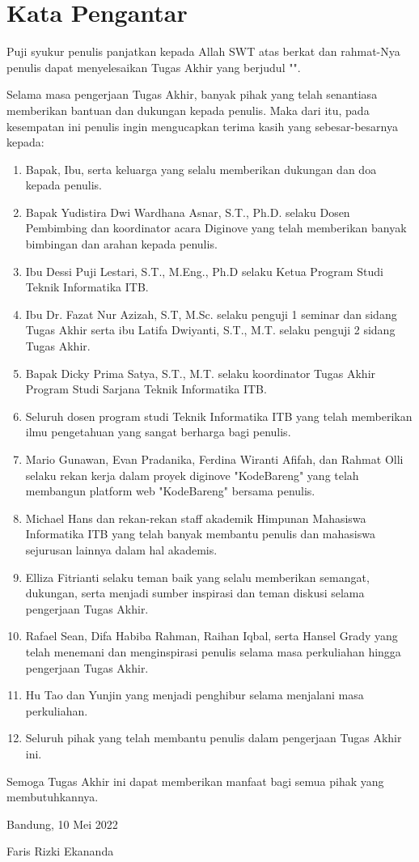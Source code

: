 \chapter*{Kata Pengantar}

Puji syukur penulis panjatkan kepada Allah SWT atas berkat dan rahmat-Nya penulis dapat menyelesaikan Tugas Akhir yang berjudul "\thetitle".

Selama masa pengerjaan Tugas Akhir, banyak pihak yang telah senantiasa memberikan bantuan dan dukungan kepada penulis. Maka dari itu, pada kesempatan ini penulis ingin mengucapkan terima kasih yang sebesar-besarnya kepada:

\begin{enumerate}
  \item Bapak, Ibu, serta keluarga yang selalu memberikan dukungan dan doa kepada penulis.
  \item Bapak Yudistira Dwi Wardhana Asnar, S.T., Ph.D. selaku Dosen Pembimbing dan koordinator acara Diginove yang telah memberikan banyak bimbingan dan arahan kepada penulis.
  \item Ibu Dessi Puji Lestari, S.T., M.Eng., Ph.D selaku Ketua Program Studi Teknik Informatika ITB.
  \item Ibu Dr. Fazat Nur Azizah, S.T, M.Sc. selaku penguji 1 seminar dan sidang Tugas Akhir serta ibu Latifa Dwiyanti, S.T., M.T. selaku penguji 2 sidang Tugas Akhir.
  \item Bapak Dicky Prima Satya, S.T., M.T. selaku koordinator Tugas Akhir Program Studi Sarjana Teknik Informatika ITB.
  \item Seluruh dosen program studi Teknik Informatika ITB yang telah memberikan ilmu pengetahuan yang sangat berharga bagi penulis.
  \item Mario Gunawan, Evan Pradanika, Ferdina Wiranti Afifah, dan Rahmat Olli selaku rekan kerja dalam proyek diginove "KodeBareng" yang telah membangun platform web "KodeBareng" bersama penulis.
  \item Michael Hans dan rekan-rekan staff akademik Himpunan Mahasiswa Informatika ITB yang telah banyak membantu penulis dan mahasiswa sejurusan lainnya dalam hal akademis.
  \item Elliza Fitrianti selaku teman baik yang selalu memberikan semangat, dukungan, serta menjadi sumber inspirasi dan teman diskusi selama pengerjaan Tugas Akhir.
  \item Rafael Sean, Difa Habiba Rahman, Raihan Iqbal, serta Hansel Grady yang telah menemani dan menginspirasi penulis selama masa perkuliahan hingga pengerjaan Tugas Akhir.
  \item Hu Tao dan Yunjin yang menjadi penghibur selama menjalani masa perkuliahan.
  \item Seluruh pihak yang telah membantu penulis dalam pengerjaan Tugas Akhir ini.
\end{enumerate}

Semoga Tugas Akhir ini dapat memberikan manfaat bagi semua pihak yang membutuhkannya.

\begin{flushright}
  Bandung, 10 Mei 2022


  Faris Rizki Ekananda
\end{flushright}